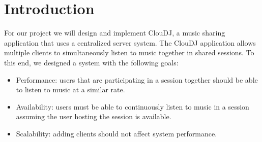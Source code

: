\section{Introduction}
\label{sec:intro}
For our project we will design and implement ClouDJ, 
a music sharing application that uses a centralized 
server system. The ClouDJ application allows multiple 
clients to simultaneously listen to music together 
in shared sessions. To this end, we designed a system 
with the following goals:
\begin{itemize}
  \item Performance: users that are participating in 
    a session together should be able to listen to music at a similar rate.
  \item Availability: users must be able to continuously 
    listen to music in a session assuming the user hosting 
    the session is available.
  \item Scalability: adding clients should not affect system performance.
\end{itemize}

